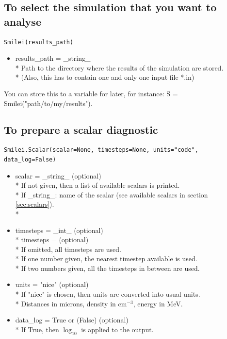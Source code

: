 \documentclass[11pt]{article}
\newcommand{\code}[1]{\colorbox{yellow!15}{\ttfamily #1}}
\begin{document}
\subsection{To select the simulation that you want to analyse}

\begin{lstlisting}
Smilei(results_path)
\end{lstlisting}

\begin{itemize}
\item \code{results\_path} = \code{\_string\_}\\*
	Path to the directory where the results of the simulation are stored.\\*
	(Also, this has to contain one and only one input file *.in)
\end{itemize}

You can store this to a variable for later, for instance: \code{S = Smilei("path/to/my/results")}.

\subsection{To prepare a scalar diagnostic}

\begin{lstlisting}
Smilei.Scalar(scalar=None, timesteps=None, units="code", data_log=False)
\end{lstlisting}

\begin{itemize}
\item \code{scalar} = \code{\_string\_} (optional)\\*
	If not given, then a list of available scalars is printed.\\*
	If \code{\_string\_}: name of the scalar (see available scalars in section \ref{sec:scalars}).\\*

\item \code{timesteps} =  \code{\_int\_ }          (optional)\\*
	\code{timesteps} = \code{[\_int\_, \_int\_]}   (optional)\\*
	If omitted, all timesteps are used.\\*
	If one number  given, the nearest timestep available is used.\\*
	If two numbers given, all the timesteps in between are used.

\item \code{units} = \code{"nice"}    (optional)\\*
	If \code{"nice"} is chosen, then units are converted into usual units.\\*
	Distances in microns, density in cm$^{-3}$, energy in MeV.

\item \code{data\_log} = \code{True} or (\code{False})       (optional)\\*
	If True, then $\log_{10}$ is applied to the output.
\end{itemize}
\vspace{0.5cm}
\end{document}
